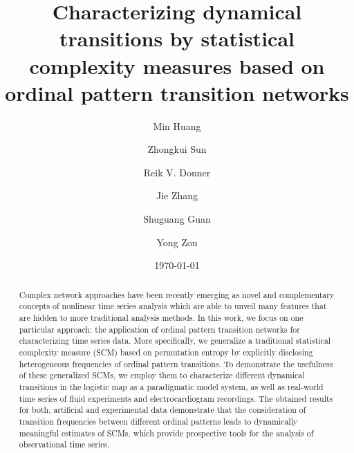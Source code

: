 \documentclass[12pt,aip,cha,reprint,nofootinbib]{revtex4-1}
\begin{document}
\title{Characterizing dynamical transitions by statistical complexity measures based on ordinal pattern transition networks} 

\author{Min Huang}

\author{Zhongkui Sun}

\author{Reik V. Donner}

\author{Jie Zhang}

\author{Shuguang Guan}
	
\author{Yong Zou}

\date{\today}

\begin{abstract}
Complex network approaches have been recently emerging as novel and complementary concepts of nonlinear time series analysis which are able to unveil many features that are hidden to more traditional analysis methods. In this work, we focus on one particular approach: the application of ordinal pattern transition networks for characterizing time series data. More specifically, we generalize a traditional statistical complexity measure (SCM) based on permutation entropy by explicitly disclosing heterogeneous frequencies of ordinal pattern transitions. To demonstrate the usefulness of these generalized SCMs, we employ them to characterize different dynamical transitions in the logistic map as a paradigmatic model system, as well as real-world time series of fluid experiments and electrocardiogram recordings. The obtained results for both, artificial and experimental data demonstrate that the consideration of transition frequencies between different ordinal patterns leads to dynamically meaningful estimates of SCMs, which provide prospective tools for the analysis of observational time series. 
\end{abstract}
\end{document}

